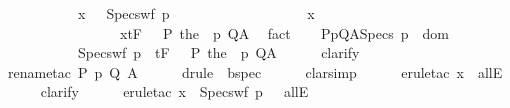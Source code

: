 \begin{isabellebody}
\ \ \ \ \ \ \ \ \ \ \ {\isacharparenleft}{\isasymforall}x{\isachardot}\ {\isasymTheta}\ {\isasymunion}\ Specs{\isacharunderscore}wf\ p\ {\isasymtau}\isanewline
\ \ \ \ \ \ \ \ \ \ \ \ \ \ \ \ \ {\isasymsubseteq}\ x\ {\isasymlongrightarrow}\isanewline
\ \ \ \ \ \ \ \ \ \ \ \ \ \ \ \ \ {\isasymGamma}{\isacharcomma}x{\isasymturnstile}\isactrlsub t\isactrlbsub {\isacharslash}F\isactrlesub \ {\isacharparenleft}{\isacharbraceleft}{\isasymtau}{\isacharbraceright}\ {\isasyminter}\ P{\isacharparenright}\ {\isacharparenleft}the\ {\isacharparenleft}{\isasymGamma}\ p{\isacharparenright}{\isacharparenright}\ Q{\isacharcomma}A{\isacharparenright}{\isacharparenright}{\isachardoublequoteclose}\ \isamarkupfalse%
\ fact\isanewline
\ \ \isamarkupfalse%
\ {\isachardoublequoteopen}{\isasymforall}{\isacharparenleft}P{\isacharcomma}p{\isacharcomma}Q{\isacharcomma}A{\isacharparenright}{\isasymin}Specs{\isachardot}\ p\ {\isasymin}\ dom\ {\isasymGamma}\ {\isasymand}\ \isanewline
\ \ \ \ \ \ \ \ \ {\isacharparenleft}{\isasymforall}{\isasymtau}{\isachardot}\ {\isasymGamma}{\isacharcomma}{\isasymTheta}{\isacharprime}{\isasymunion}\ Specs{\isacharunderscore}wf\ p\ {\isasymtau}\ {\isasymturnstile}\isactrlsub t\isactrlbsub {\isacharslash}F\isactrlesub \ {\isacharparenleft}{\isacharbraceleft}{\isasymtau}{\isacharbraceright}\ {\isasyminter}\ P{\isacharparenright}\ {\isacharparenleft}the\ {\isacharparenleft}{\isasymGamma}\ p{\isacharparenright}{\isacharparenright}\ Q{\isacharcomma}A{\isacharparenright}{\isachardoublequoteclose}\isanewline
\ \ \ \ \isamarkupfalse%
\ {\isacharparenleft}clarify{\isacharparenright}\isanewline
\ \ \ \ \isamarkupfalse%
\ {\isacharparenleft}rename{\isacharunderscore}tac\ P\ p\ Q\ A{\isacharparenright}\isanewline
\ \ \ \ \isamarkupfalse%
\ {\isacharparenleft}drule\ {\isacharparenleft}{}{\isacharparenright}\ bspec{\isacharparenright}\isanewline
\ \ \ \ \isamarkupfalse%
\ {\isacharparenleft}clarsimp{\isacharparenright}\isanewline
\ \ \ \ \isamarkupfalse%
\ {\isacharparenleft}erule{\isacharunderscore}tac\ x{\isacharequal}{\isasymtau}\ \ allE{\isacharparenright}\isanewline
\ \ \ \ \isamarkupfalse%
\ clarify\isanewline
\ \ \ \ \isamarkupfalse%
\ {\isacharparenleft}erule{\isacharunderscore}tac\ x{\isacharequal}{\isachardoublequoteopen}{\isasymTheta}{\isacharprime}\ {\isasymunion}\ Specs{\isacharunderscore}wf\ p\ {\isasymtau}{\isachardoublequoteclose}\ \ allE{\isacharparenright}\isanewline

\end{isabellebody}
